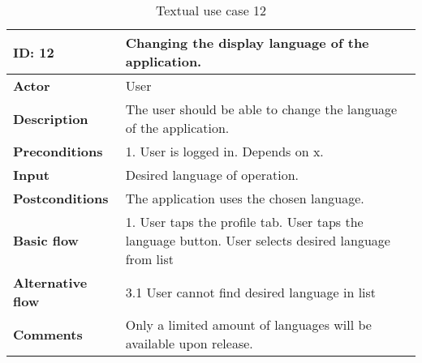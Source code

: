 \begin{table}[H]
\begin{tabular}{|l|p{11.7cm}|}
\hline
\textbf{ID: }12&\textbf{Changing the display language of the application.}
\\\hline
\textbf{Actor} &User
\\\hline
\textbf{Description}&
The user should be able to change the language of the application.\\\hline
\textbf{Preconditions}&
1. User is logged in.\newline
Depends on x.\\\hline
\textbf{Input}&
Desired language of operation.\\\hline
\textbf{Postconditions}& 
The application uses the chosen language.\\\hline
\textbf{Basic flow}&
1. User taps the profile tab\newline
2. User taps the language button\newline
3. User selects desired language from list
\\\hline
\textbf{Alternative flow}&
3.1 User cannot find desired language in list
\\\hline
\textbf{Comments}&Only a limited amount of languages will be available upon release. \\\hline
\end{tabular}
\caption{Textual use case 12}
\end{table}


